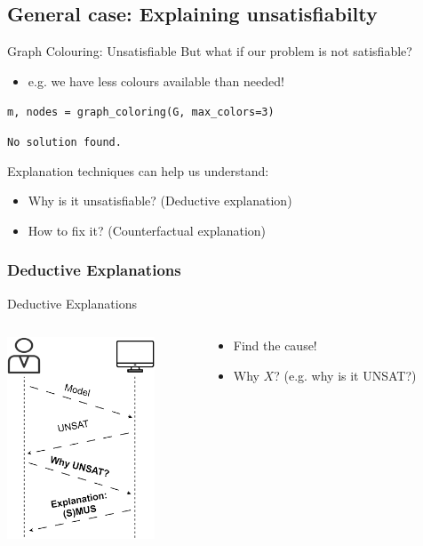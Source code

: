 \documentclass{cons-beamer}
\begin{document}
\subsection{General case: Explaining unsatisfiabilty}

\begin{frame}{Graph Colouring: Unsatisfiable}
    But what if our problem is not satisfiable?
    \begin{itemize}
        \item e.g. we have less colours available than needed!
    \end{itemize}
    \begin{example}
      \texttt{m, nodes = graph\_coloring(G, max\_colors=3)}
      
      \texttt{No solution found.}
    \end{example}
    \vfill

    Explanation techniques can help us understand:
    \begin{itemize}
      \item Why is it unsatisfiable? (Deductive explanation) 
      \item How to fix it? (Counterfactual explanation)
    \end{itemize}
\end{frame}


\subsubsection{Deductive Explanations}

\begin{frame}{Deductive  Explanations}
  \begin{columns}
    \begin{column}{0.5\textwidth}
      \begin{center}
        \includegraphics[height=60mm]{images/texpl_img/explain_unsat.png}
      \end{center}        
    \end{column}
    \begin{column}{0.5\textwidth}
      \begin{itemize}
        \item Find the cause!
        \item Why $X$? (e.g. why is it UNSAT?)
      \end{itemize}
    \end{column}
  \end{columns}    
\end{frame}
\end{document}
